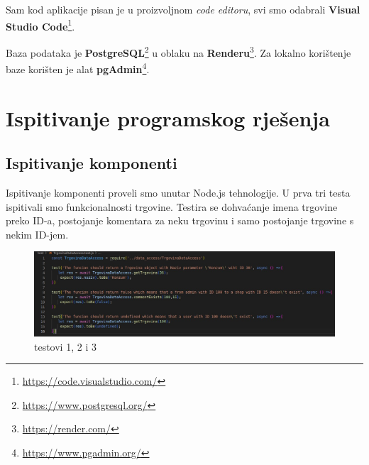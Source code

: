			Sam kod aplikacije pisan je u proizvoljnom \textit{code editoru}, svi smo odabrali \textbf{Visual Studio Code}\footnote{\url{https://code.visualstudio.com/}}.
			
			Baza podataka je \textbf{PostgreSQL}\footnote{\url{https://www.postgresql.org/}} u oblaku na \textbf{Renderu}\footnote{\url{https://render.com/}}. Za lokalno korištenje baze korišten je alat \textbf{pgAdmin}\footnote{\url{https://www.pgadmin.org/}}. 
			
			\eject 
		
	
		\section{Ispitivanje programskog rješenja}
			
			
	
			
			\subsection{Ispitivanje komponenti}
			
			Ispitivanje komponenti proveli smo unutar Node.js tehnologije. U prva tri testa ispitivali smo funkcionalnosti trgovine. Testira se dohvaćanje imena trgovine preko ID-a, postojanje komentara za neku trgovinu i samo postojanje trgovine s nekim ID-jem.
			\begin{figure}[H]
			\includegraphics[width=\textwidth]{slike/test123.jpeg} %
			\caption{testovi 1, 2 i 3}
			\label{fig:test123} %
			\end{figure}
			
